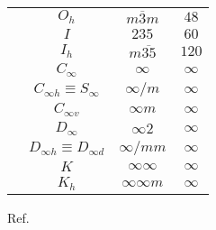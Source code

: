 \documentclass[a4paper, 11pt]{article}
\theoremstyle{definition}
\begin{document}
\begin{table}[tb]
\begin{tabular}{cccc}
    & $O_{h}$ & $m\overline{3}m$ & $48$ \\
    & $I$     & $235$            & $60$ \\
    & $I_{h}$ & $m\overline{35}$ & $120$ \\
    \hline
    & $C_{\infty}$                       & $\infty$          & $\infty$ \\
    & $C_{\infty h} \equiv S_{\infty}$   & $\infty / m$      & $\infty$ \\
    & $C_{\infty v}$                     & $\infty m$        & $\infty$ \\
    & $D_{\infty}$                       & $\infty 2$        & $\infty$ \\
    & $D_{\infty h} \equiv D_{\infty d}$ & $\infty / mm$     & $\infty$\\
    & $K$                                & $\infty \infty$   & $\infty$\\
    & $K_{h}$                            & $\infty \infty m$ & $\infty$\\
    \hline \hline
  \end{tabular}
\end{table}

Ref.~\cite{RevModPhys.35.641}



\end{document}

